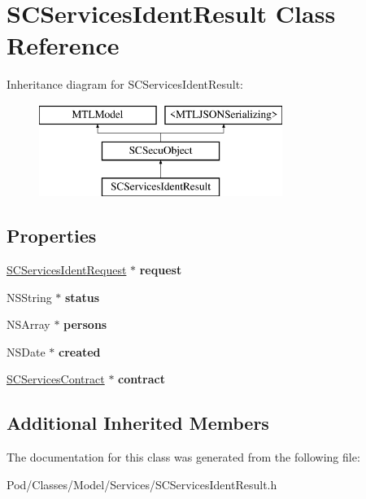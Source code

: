 \hypertarget{interface_s_c_services_ident_result}{}\section{S\+C\+Services\+Ident\+Result Class Reference}
\label{interface_s_c_services_ident_result}
Inheritance diagram for S\+C\+Services\+Ident\+Result\+:\begin{figure}[H]
\begin{center}
\leavevmode
\includegraphics[height=3.000000cm]{interface_s_c_services_ident_result}
\end{center}
\end{figure}
\subsection*{Properties}
\begin{DoxyCompactItemize}
\item 
\hyperlink{interface_s_c_services_ident_request}{S\+C\+Services\+Ident\+Request} $\ast$ {\bfseries request}\hypertarget{interface_s_c_services_ident_result_a4bce272cf169bca5c6b81e5f6ad983de}{}\label{interface_s_c_services_ident_result_a4bce272cf169bca5c6b81e5f6ad983de}

\item 
N\+S\+String $\ast$ {\bfseries status}\hypertarget{interface_s_c_services_ident_result_af03cc190ab007948076e55dcf2a735e7}{}\label{interface_s_c_services_ident_result_af03cc190ab007948076e55dcf2a735e7}

\item 
N\+S\+Array $\ast$ {\bfseries persons}\hypertarget{interface_s_c_services_ident_result_a44beaf0655b6a1678bb5ce5a883d52b9}{}\label{interface_s_c_services_ident_result_a44beaf0655b6a1678bb5ce5a883d52b9}

\item 
N\+S\+Date $\ast$ {\bfseries created}\hypertarget{interface_s_c_services_ident_result_ab8467a12bc014fe22fb1d818bb8c265a}{}\label{interface_s_c_services_ident_result_ab8467a12bc014fe22fb1d818bb8c265a}

\item 
\hyperlink{interface_s_c_services_contract}{S\+C\+Services\+Contract} $\ast$ {\bfseries contract}\hypertarget{interface_s_c_services_ident_result_a7026ee77a9e7d9651d6da0b9d8d4c32b}{}\label{interface_s_c_services_ident_result_a7026ee77a9e7d9651d6da0b9d8d4c32b}

\end{DoxyCompactItemize}
\subsection*{Additional Inherited Members}


The documentation for this class was generated from the following file\+:\begin{DoxyCompactItemize}
\item 
Pod/\+Classes/\+Model/\+Services/S\+C\+Services\+Ident\+Result.\+h\end{DoxyCompactItemize}

